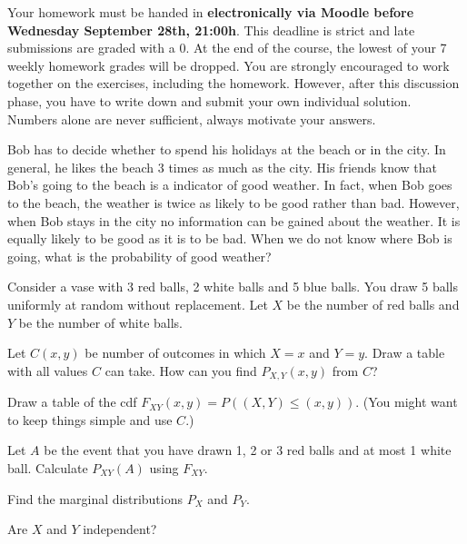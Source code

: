 \documentclass[a4paper,10pt,landscape,twocolumn]{scrartcl}
\newcommand\deadline{Wednesday September 28th, 21:00h}
\begin{document}
\homeworkproblems

{\sffamily\noindent
Your homework must be handed in \textbf{electronically via Moodle before \deadline}.  This deadline is strict and late submissions are graded with a 0. At the end of the course, the lowest of your 7 weekly homework grades will be dropped. You are strongly encouraged to work together on the exercises, including the homework. However, after this discussion phase, you have to write down and submit your own individual solution. Numbers alone are never sufficient, always motivate your answers.
}


\begin{exercise}[1pt]
Bob has to decide whether to spend his holidays at the beach or in the city. In general, he likes the beach 3 times as much as the city. His friends know that Bob's going to the beach is a indicator of good weather. In fact, when Bob goes to the beach, the weather is twice as likely to be good rather than bad. However, when Bob stays in the city no information can be gained about the weather. It is equally likely to be good as it is to be bad. When we do not know where Bob is going, what is the probability of good weather?	
\end{exercise}


\begin{exercise}[4pt]
	Consider a vase with 3 red balls, 2 white balls and 5 blue balls. You draw 5 balls uniformly at random without replacement. Let $X$ be the number of red balls and $Y$ be the number of white balls.
	
	\begin{subex}[1pt]
		Let $C(x,y)$ be 	number of outcomes in which $X=x$ and $Y=y$. Draw a table with all values $C$ can take. How can you find $P_{X,Y}(x,y)$ from $C$?
	\end{subex}
	
	\begin{subex}[1pt]
		Draw a table of the cdf $F_{XY}(x,y) = P((X,Y) \le (x,y))$. (You might want to keep things simple and use $C$.)	
	\end{subex}
	
	\begin{subex}[1pt]
		Let $A$ be the event that you have drawn 1, 2 or 3 red balls and at most 1 white ball. Calculate $P_{XY}(A)$ using $F_{XY}$.
	\end{subex}
	
	\begin{subex}[0.5pt]
	Find the marginal distributions $P_X$ and $P_Y$.	
	\end{subex}
	
	\begin{subex}[0.5pt]
	Are $X$ and $Y$ independent?	
	\end{subex}
\end{exercise}
\end{document}
